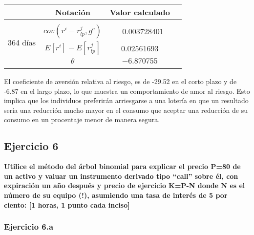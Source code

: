 \documentclass[
]{article}
\begin{document}
\begin{table}[h!]
                \begin{center} 
                    \begin{tabular}{|c|c|c|c|} 
                        \hline 
                        \mbox{}\;\;\;\;\;\mbox{}& \; Notación\;  & \; Valor calculado\; \\ 
                        \hline 
                        \multirow{4}{*}{\begin{sideways}364 días\end{sideways}}  
                            &   &  \\
                        &$cov(r^i-r_{lp}^j, g^c)$  & $-0.003728401$ \\
                        &$E[r^i]-E[r^j_{lp}]$ & $0.02561693$ \\ 
                        &$\theta$ & $-6.870755$ \\ 
                        &  &   \\
                        \hline \hline
                        \hline
                    \end{tabular}
                \end{center}
\end{table}

El coeficiente de aversión relativa al riesgo, es de -29.52 en el corto
plazo y de -6.87 en el largo plazo, lo que muestra un comportamiento de
amor al riesgo. Esto implica que los individuos preferirán arriesgarse a
una lotería en que un resultado sería una reducción mucho mayor en el
consumo que aceptar una reducción de su consumo en un procentaje menor
de manera segura.

\newpage

\hypertarget{ejercicio-6}{%
\subsection{Ejercicio 6}\label{ejercicio-6}}

\textbf{Utilice el método del árbol binomial para explicar el precio
P=80 de un activo y valuar un instrumento derivado tipo ``call'' sobre
él, con expiración un año después y precio de ejercicio K=P-N donde N es
el número de su equipo (!), asumiendo una tasa de interés de 5 por
ciento: {[}1 horas, 1 punto cada inciso{]}}

\hypertarget{ejercicio-6.a}{%
\subsubsection{Ejercicio 6.a}\label{ejercicio-6.a}}
\end{document}
